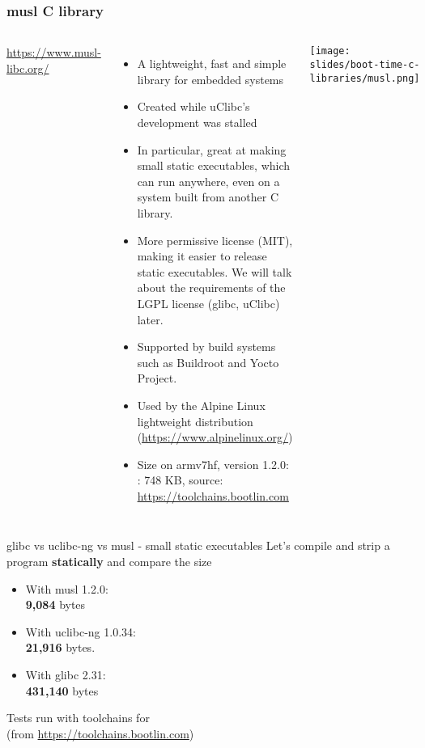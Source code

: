 \begin{frame}
  \frametitle{musl C library}
  \begin{columns}
      \url{https://www.musl-libc.org/}
      \begin{itemize}
      \item A lightweight, fast and simple library for embedded systems
      \item Created while uClibc's development was stalled
      \item In particular, great at making small static executables,
            which can run anywhere, even on a system built
            from another C library.
      \item More permissive license (MIT), making it easier to release
            static executables. We will talk about the requirements
            of the LGPL license (glibc, uClibc) later.
      \item Supported by build systems such as Buildroot and Yocto
        Project.
      \item Used by the Alpine Linux lightweight distribution
        (\url{https://www.alpinelinux.org/})
      \item Size on armv7hf, version 1.2.0:
        : 748 KB, source: \url{https://toolchains.bootlin.com}
      \end{itemize}
    \texttt{[image: slides/boot-time-c-libraries/musl.png]}
  \end{columns}
\end{frame}

\begin{frame}{glibc vs uclibc-ng vs musl - small static executables}
  Let's compile and strip a  program {\bf statically} and
compare the size
  \begin{itemize}
    \item With musl 1.2.0:\\
          {\bf 9,084} bytes
    \item With uclibc-ng 1.0.34:\\
          {\bf 21,916} bytes.
    \item With glibc 2.31:\\
          {\bf 431,140} bytes
  \end{itemize}
  Tests run with  toolchains for \\
  (from \url{https://toolchains.bootlin.com})
\end{frame}

